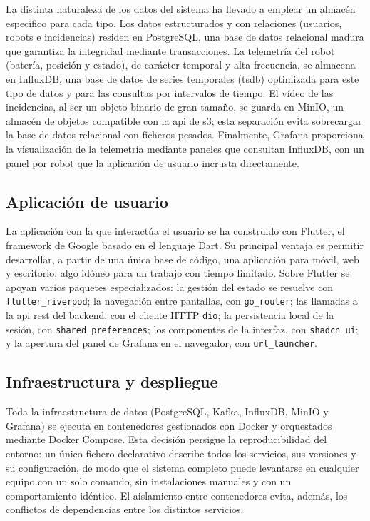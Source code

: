 La distinta naturaleza de los datos del sistema ha llevado a emplear un almacén
específico para cada tipo. Los datos estructurados y con relaciones (usuarios,
robots e incidencias) residen en PostgreSQL, una base de datos relacional madura
que garantiza la integridad mediante transacciones. La telemetría del robot
(batería, posición y estado), de carácter temporal y alta frecuencia, se almacena
en InfluxDB, una base de datos de series temporales (\gls{tsdb}) optimizada para
este tipo de datos y para las consultas por intervalos de tiempo. El vídeo de las
incidencias, al ser un objeto binario de gran tamaño, se guarda en MinIO, un
almacén de objetos compatible con la \gls{api} de \gls{s3}; esta separación evita
sobrecargar la base de datos relacional con ficheros pesados. Finalmente, Grafana
proporciona la visualización de la telemetría mediante paneles que consultan
InfluxDB, con un panel por robot que la aplicación de usuario incrusta
directamente.

\subsection{Aplicación de usuario}

La aplicación con la que interactúa el usuario se ha construido con Flutter, el
framework de Google basado en el lenguaje Dart. Su principal ventaja es permitir
desarrollar, a partir de una única base de código, una aplicación para móvil, web
y escritorio, algo idóneo para un trabajo con tiempo limitado. Sobre Flutter se
apoyan varios paquetes especializados: la gestión del estado se resuelve con
\texttt{flutter\_riverpod}; la navegación entre pantallas, con \texttt{go\_router};
las llamadas a la \gls{api} \gls{rest} del backend, con el cliente HTTP
\texttt{dio}; la persistencia local de la sesión, con \texttt{shared\_preferences};
los componentes de la interfaz, con \texttt{shadcn\_ui}; y la apertura del panel de
Grafana en el navegador, con \texttt{url\_launcher}.

\subsection{Infraestructura y despliegue}

Toda la infraestructura de datos (PostgreSQL, Kafka, InfluxDB, MinIO y Grafana) se
ejecuta en contenedores gestionados con Docker y orquestados mediante Docker
Compose. Esta decisión persigue la reproducibilidad del entorno: un único fichero
declarativo describe todos los servicios, sus versiones y su configuración, de modo
que el sistema completo puede levantarse en cualquier equipo con un solo comando,
sin instalaciones manuales y con un comportamiento idéntico. El aislamiento entre
contenedores evita, además, los conflictos de dependencias entre los distintos
servicios.

